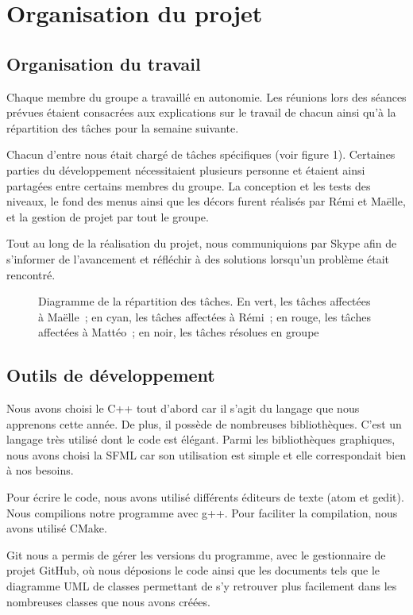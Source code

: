 \chapter{Organisation du projet}

\section{Organisation du travail}

Chaque membre du groupe a travaillé en autonomie. Les réunions lors des séances
prévues étaient consacrées aux explications sur le travail de chacun ainsi qu'à
la répartition des tâches pour la semaine suivante.

Chacun d'entre nous était chargé de tâches spécifiques (voir figure 1).
Certaines parties du développement nécessitaient plusieurs personne et
étaient ainsi partagées entre certains membres du groupe. La conception
et les tests des niveaux, le fond des menus ainsi que les décors furent
réalisés par Rémi et Maëlle, et la gestion de projet par tout le groupe.

Tout au long de la réalisation du projet, nous communiquions par Skype
afin de s'informer de l'avancement et réfléchir à des solutions lorsqu'un
problème était rencontré.

\begin{landscape}
\begin{figure}[p!]
    \scalebox{0.56}{}
    \caption{
        Diagramme de la répartition des tâches. En vert, les tâches
        affectées à Maëlle~; en cyan, les tâches affectées à Rémi~;
        en rouge, les tâches affectées à Mattéo~; en noir, les
        tâches résolues en groupe
    }
    \label{fig:organisation-gantt}
\end{figure}
\end{landscape}

\section{Outils de développement}

Nous avons choisi le C++ tout d'abord car il s'agit du langage que nous
apprenons cette année. De plus, il possède de nombreuses bibliothèques.
C'est un langage très utilisé dont le code est élégant. Parmi les bibliothèques
graphiques, nous avons choisi la SFML car son utilisation est simple et
elle correspondait bien à nos besoins.

Pour écrire le code, nous avons utilisé différents éditeurs de texte
(atom et gedit). Nous compilions notre programme avec g++. Pour faciliter
la compilation, nous avons utilisé CMake.

Git nous a permis de gérer les versions du programme, avec le gestionnaire
de projet GitHub, où nous déposions le code ainsi que les documents tels
que le diagramme UML de classes permettant de s'y retrouver plus facilement
dans les nombreuses classes que nous avons créées.
